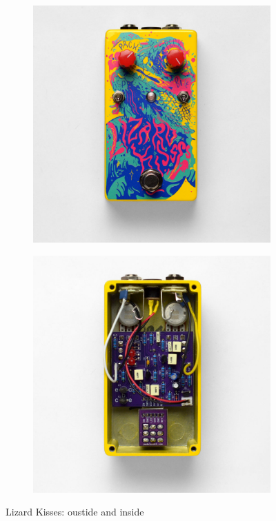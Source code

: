 \documentclass[a4paper,12pt]{article}
\begin{document}
\begin{figure}[h!]
  \centering
  \begin{subfigure}[b]{0.49\textwidth}
    \centering
    \includegraphics[width=\textwidth]{lizard-kisses-1000px.jpg}
  \end{subfigure}
  \begin{subfigure}[b]{0.49\textwidth}
    \centering
    \includegraphics[width=\textwidth]{lizard-kisses-inside-1000px.jpg}
  \end{subfigure}
  \caption{Lizard Kisses: oustide and inside}
  \label{fig:lk}
\end{figure}
\end{document}
